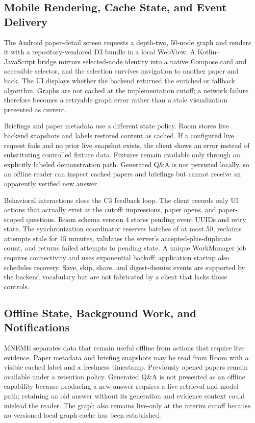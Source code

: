 \subsection{Mobile Rendering, Cache State, and Event Delivery}

The Android paper-detail screen requests a depth-two, 50-node graph and renders it with a repository-vendored D3 bundle in a local WebView. A Kotlin--JavaScript bridge mirrors selected-node identity into a native Compose card and accessible selector, and the selection survives navigation to another paper and back. The UI displays whether the backend returned the enriched or fallback algorithm. Graphs are not cached at the implementation cutoff; a network failure therefore becomes a retryable graph error rather than a stale visualization presented as current.

Briefings and paper metadata use a different state policy. Room stores live backend snapshots and labels restored content as cached. If a configured live request fails and no prior live snapshot exists, the client shows an error instead of substituting controlled fixture data. Fixtures remain available only through an explicitly labeled demonstration path. Generated Q\&A is not persisted locally, so an offline reader can inspect cached papers and briefings but cannot receive an apparently verified new answer.

Behavioral interactions close the C3 feedback loop. The client records only UI actions that actually exist at the cutoff: impressions, paper opens, and paper-scoped questions. Room schema version 4 stores pending event UUIDs and retry state. The synchronization coordinator reserves batches of at most 50, reclaims attempts stale for 15 minutes, validates the server's accepted-plus-duplicate count, and returns failed attempts to pending state. A unique WorkManager job requires connectivity and uses exponential backoff; application startup also schedules recovery. Save, skip, share, and digest-dismiss events are supported by the backend vocabulary but are not fabricated by a client that lacks those controls.

\subsection{Offline State, Background Work, and Notifications}

MNEME separates data that remain useful offline from actions that require live evidence.
Paper metadata and briefing snapshots may be read from Room with a visible cached label and a freshness timestamp.
Previously opened papers remain available under a retention policy.
Generated Q\&A is not presented as an offline capability because producing a new answer requires a live retrieval and model path; retaining an old answer without its generation and evidence context could mislead the reader.
The graph also remains live-only at the interim cutoff because no versioned local graph cache has been established.

